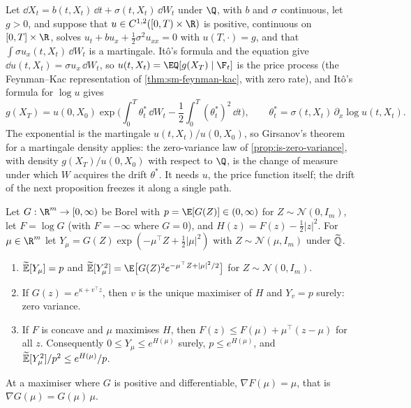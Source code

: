 \begin{remark}\label{rem:is-feedback}
Let $\dd X_t=b(t,X_t)\,\dd t+\sigma(t,X_t)\,\dd W_t$ under $\Q$, with $b$ and $\sigma$
continuous, let $g>0$, and suppose that $u\in C^{1,2}([0,T)\times\R)$ is positive, continuous
on $[0,T]\times\R$, solves $u_t+bu_x+\frac12\sigma^2u_{xx}=0$ with $u(T,\cdot)=g$, and
that $\int\sigma u_x(t,X_t)\,\dd W_t$ is a martingale. It\^o's formula and the equation give
$\dd u(t,X_t)=\sigma u_x\,\dd W_t$, so $u(t,X_t)=\EQ[g(X_T)\mid\F_t]$ is the price process (the
Feynman--Kac representation of \cref{thm:sm-feynman-kac}, with zero rate), and It\^o's formula
for $\log u$ gives
\[
  g(X_T)=u(0,X_0)\exp\Big(\int_0^T\theta^*_t\,\dd W_t-\frac12\int_0^T(\theta^*_t)^2\,\dd t\Big),\qquad
  \theta^*_t=\sigma(t,X_t)\,\partial_x\log u(t,X_t).
\]
The exponential is the martingale $u(t,X_t)/u(0,X_0)$, so Girsanov's theorem for a martingale
density \citep[Theorem~3.5.1]{karatzas-shreve} applies: the zero-variance law of
\cref{prop:is-zero-variance}, with density $g(X_T)/u(0,X_0)$ with respect to $\Q$, is the
change of measure under which $W$ acquires the drift $\theta^*$. It needs $u$, the price
function itself; the drift of the next proposition freezes it along a single path.
\end{remark}

\begin{proposition}\label{prop:is-optimal-drift}
Let $G:\R^m\to[0,\infty)$ be Borel with $p=\E[G(Z)]\in(0,\infty)$ for $Z\sim\mathcal N(0,I_m)$,
let $F=\log G$ (with $F=-\infty$ where $G=0$), and $H(z)=F(z)-\frac12|z|^2$. For $\mu\in\R^m$
let $Y_\mu=G(Z)\exp(-\mu^\top Z+\frac12|\mu|^2)$ with $Z\sim\mathcal N(\mu,I_m)$ under $\widetilde{\mathbb Q}$.
\begin{enumerate}[label=(\roman*)]
  \item $\widetilde{\mathbb E}[Y_\mu]=p$ and $\Et[Y_\mu^2]=\E\big[G(Z)^2e^{-\mu^\top Z+|\mu|^2/2}\big]$ for
    $Z\sim\mathcal N(0,I_m)$.
  \item If $G(z)=e^{\kappa+v^\top z}$, then $v$ is the unique maximiser of $H$ and
    $Y_v=p$ surely: zero variance.
  \item If $F$ is concave and $\mu$ maximises $H$, then $F(z)\le F(\mu)+\mu^\top(z-\mu)$ for
    all $z$. Consequently $0\le Y_\mu\le e^{H(\mu)}$ surely, $p\le e^{H(\mu)}$, and
    $\widetilde{\mathbb E}[Y_\mu^2]/p^2\le e^{H(\mu)}/p$.
\end{enumerate}
At a maximiser where $G$ is positive and differentiable, $\nabla F(\mu)=\mu$, that is
$\nabla G(\mu)=G(\mu)\,\mu$.
\end{proposition}

